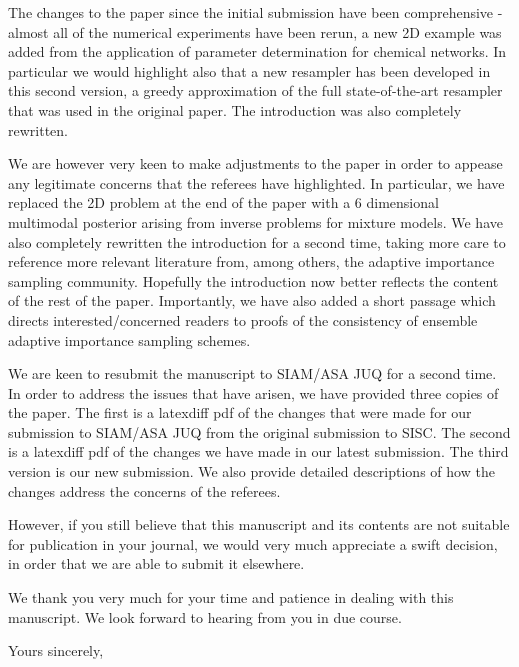 \documentclass{letter}
\begin{document}
\begin{letter}{ }
The changes to the paper since the initial submission have been comprehensive - almost all of the numerical experiments have been rerun, a new 2D example was added from the application of parameter determination for chemical networks. In particular we would highlight also that a new resampler has been developed in this second version, a greedy approximation of the full state-of-the-art resampler that was used in the original paper. The introduction was also completely rewritten.

We are however very keen to make adjustments to the paper in order to appease any legitimate concerns that the referees have highlighted. In particular, we have replaced the 2D problem at the end of the paper with a 6 dimensional multimodal posterior arising from inverse problems for mixture models. We have also completely rewritten the introduction for a second time, taking more care to reference more relevant literature from, among others, the adaptive importance sampling community. Hopefully the introduction now better reflects the content of the rest of the paper. Importantly, we have also added a short passage which directs interested/concerned readers to proofs of the consistency of ensemble adaptive importance sampling schemes.

We are keen to resubmit the manuscript to SIAM/ASA JUQ for a second time. In order to address the issues that have arisen, we have provided three copies of the paper. The first is a latexdiff pdf of the changes that were made for our submission to SIAM/ASA JUQ from the original submission to SISC. The second is a latexdiff pdf of the changes we have made in our latest submission. The third version is our new submission. We also provide detailed descriptions of how the changes address the concerns of the referees.

However, if you still believe that this manuscript and its contents are not suitable for publication in your journal, we would very much appreciate a swift decision, in order that we are able to submit it elsewhere.

We thank you very much for your time and patience in dealing with this manuscript. We look forward to hearing from you in due course.

\closing{Yours sincerely,}
\end{letter}
\end{document}

